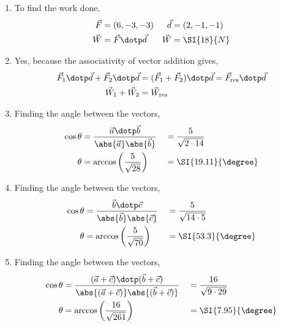 \begin{enumerate}
      \item To find the work done,
            \begin{align}
                  \vec{F} & = (6, -3, -3)           & \vec{d} & = (2, -1, -1) \\
                  \vec{W} & = \vec{F} \dotp \vec{d} & \vec{W} & = \SI{18}{N}
            \end{align}

      \item Yes, because the associativity of vector addition gives,
            \begin{align}
                  \vec{F}_1 \dotp \vec{d} + \vec{F}_2 \dotp \vec{d} &
                  = (\vec{F}_1 + \vec{F}_2) \dotp \vec{d}
                  = \vec{F}_{\text{res}} \dotp \vec{d}                \\
                  \vec{W}_1 + \vec{W}_2                             &
                  = \vec{W}_{\text{res}}
            \end{align}

      \item Finding the angle between the vectors,
            \begin{align}
                  \cos \theta                   & = \frac{\vec{a} \dotp \vec{b}}
                  {\abs{\vec{a}} \abs{\vec{b}}} &
                                                & =\frac{5}{\sqrt{2 \cdot 14}}        \\
                  \theta                        & = \arccos\left( \frac{5}{\sqrt{28}}
                  \right)                       &
                                                & = \SI{19.11}{\degree}
            \end{align}

      \item Finding the angle between the vectors,
            \begin{align}
                  \cos \theta                   & = \frac{\vec{b} \dotp \vec{c}}
                  {\abs{\vec{b}} \abs{\vec{c}}} &
                                                & =\frac{5}{\sqrt{14 \cdot 5}}        \\
                  \theta                        & = \arccos\left( \frac{5}{\sqrt{70}}
                  \right)                       &
                                                & = \SI{53.3}{\degree}
            \end{align}

      \item Finding the angle between the vectors,
            \begin{align}
                  \cos \theta                & = \frac{(\vec{a} + \vec{c}) \dotp
                        (\vec{b} + \vec{c})}
                  {\abs{(\vec{a} + \vec{c})}
                  \abs{(\vec{b} + \vec{c})}} &
                                             & =\frac{16}{\sqrt{9 \cdot 29}}         \\
                  \theta                     & = \arccos\left( \frac{16}{\sqrt{261}}
                  \right)                    &
                                             & = \SI{7.95}{\degree}
            \end{align}


\end{enumerate}

